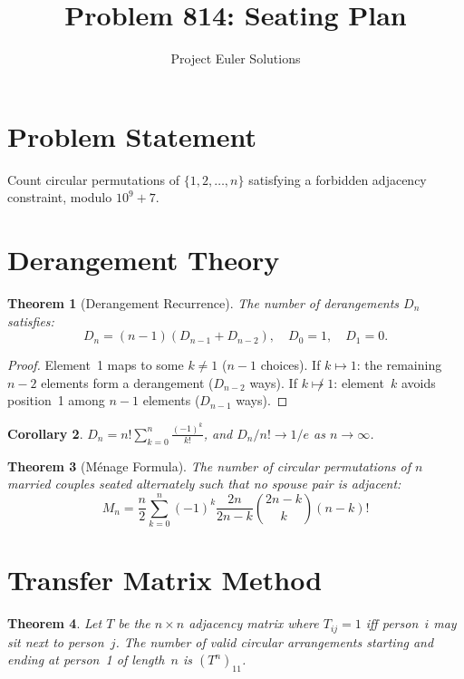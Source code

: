 \documentclass[11pt]{article}
\title{Problem 814: Seating Plan}
\author{Project Euler Solutions}
\date{}
\newtheorem{theorem}{Theorem}
\newtheorem{corollary}[theorem]{Corollary}
\begin{document}
\maketitle

\section{Problem Statement}

Count circular permutations of $\{1, 2, \ldots, n\}$ satisfying a forbidden adjacency constraint, modulo $10^9+7$.

\section{Derangement Theory}

\begin{theorem}[Derangement Recurrence]
The number of derangements $D_n$ satisfies:
\[
D_n = (n-1)(D_{n-1} + D_{n-2}), \quad D_0 = 1, \quad D_1 = 0.
\]
\end{theorem}

\begin{proof}
Element~1 maps to some $k \ne 1$ ($n-1$ choices). If $k \mapsto 1$: the remaining $n-2$ elements form a derangement ($D_{n-2}$ ways). If $k \not\mapsto 1$: element~$k$ avoids position~1 among $n-1$ elements ($D_{n-1}$ ways).
\end{proof}

\begin{corollary}
$D_n = n! \sum_{k=0}^{n} \frac{(-1)^k}{k!}$, and $D_n/n! \to 1/e$ as $n \to \infty$.
\end{corollary}

\begin{theorem}[M\'enage Formula]
The number of circular permutations of $n$ married couples seated alternately such that no spouse pair is adjacent:
\[
M_n = \frac{n}{2} \sum_{k=0}^{n} (-1)^k \frac{2n}{2n-k} \binom{2n-k}{k} (n-k)!
\]
\end{theorem}

\section{Transfer Matrix Method}

\begin{theorem}
Let $T$ be the $n \times n$ adjacency matrix where $T_{ij} = 1$ iff person~$i$ may sit next to person~$j$. The number of valid circular arrangements starting and ending at person~1 of length~$n$ is $(T^n)_{11}$.
\end{theorem}
\end{document}
